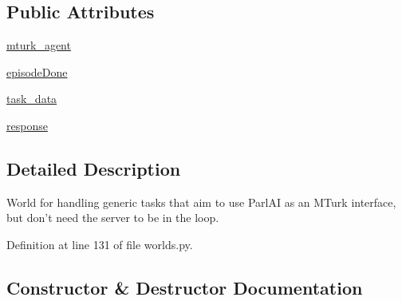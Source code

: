 \subsection*{Public Attributes}
\begin{DoxyCompactItemize}
\item 
\hyperlink{classparlai_1_1mturk_1_1core_1_1legacy__2018_1_1worlds_1_1StaticMTurkTaskWorld_af4bdeb4a05489c01d98ca8251cc2ad97}{mturk\+\_\+agent}
\item 
\hyperlink{classparlai_1_1mturk_1_1core_1_1legacy__2018_1_1worlds_1_1StaticMTurkTaskWorld_a2b173491e6af4ec163df49695ad438b7}{episode\+Done}
\item 
\hyperlink{classparlai_1_1mturk_1_1core_1_1legacy__2018_1_1worlds_1_1StaticMTurkTaskWorld_acc5db69ea637dc47c40833268ce933e9}{task\+\_\+data}
\item 
\hyperlink{classparlai_1_1mturk_1_1core_1_1legacy__2018_1_1worlds_1_1StaticMTurkTaskWorld_ad58aef0c2b48ff7a682082b81d4f25ae}{response}
\end{DoxyCompactItemize}


\subsection{Detailed Description}
\begin{DoxyVerb}World for handling generic tasks that aim to use ParlAI as an MTurk
interface, but don't need the server to be in the loop.
\end{DoxyVerb}
 

Definition at line 131 of file worlds.\+py.



\subsection{Constructor \& Destructor Documentation}
\mbox{\label{classparlai_1_1mturk_1_1core_1_1legacy__2018_1_1worlds_1_1StaticMTurkTaskWorld_afca35f07eb86bac34180c21cca0741c2}} 
